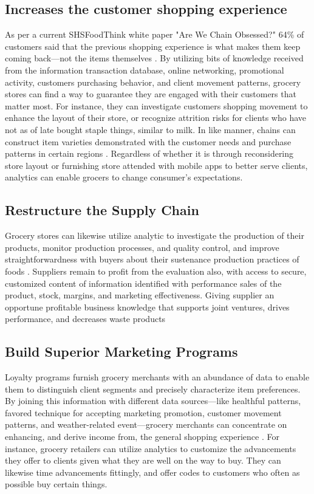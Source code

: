 \documentclass[sigconf]{acmart}
\begin{document}
\subsection{Increases the customer shopping experience }
As per a current SHSFoodThink white paper "Are We Chain Obsessed?" 64{\%} of customers said that the previous shopping experience is what makes them keep coming back—not the items themselves \cite{3}. By utilizing bits of knowledge received from the information transaction database, online networking, promotional activity, customers purchasing behavior, and client movement patterns, grocery stores can find a way to guarantee they are engaged with their customers that matter most.  
	 For instance, they can investigate customers shopping movement to enhance the layout of their store, or recognize attrition risks for clients who have not as of late bought staple things, similar to milk. In like manner, chains can construct item varieties demonstrated with the customer needs and purchase patterns in certain regions \cite{1, 3, 5}. Regardless of whether it is through reconsidering store layout or furnishing store attended with mobile apps to better serve clients, analytics can enable grocers to change consumer’s expectations. 



\subsection{Restructure the Supply Chain}

Grocery stores can likewise utilize analytic to investigate the production of their products, monitor production processes, and quality control, and improve straightforwardness with buyers about their sustenance production practices of foods \cite{2}. Suppliers remain to profit from the evaluation also, with access to secure, customized content of information identified with performance sales of the product, stock, margins, and marketing effectiveness. Giving supplier an opportune profitable business knowledge that supports joint ventures, drives performance, and decreases waste products

\subsection{Build Superior Marketing Programs}

Loyalty programs furnish grocery merchants with an abundance of data to enable them to distinguish client segments and precisely characterize item preferences. By joining this information with different data sources—like healthful patterns, favored technique for accepting marketing promotion, customer movement patterns, and weather-related event—grocery merchants can concentrate on enhancing, and derive income from, the general shopping experience \cite{3}. For instance, grocery retailers can utilize analytics to customize the advancements they offer to clients given what they are well on the way to buy. They can likewise time advancements fittingly, and offer codes to customers who often as possible buy certain things. 
\end{document}
